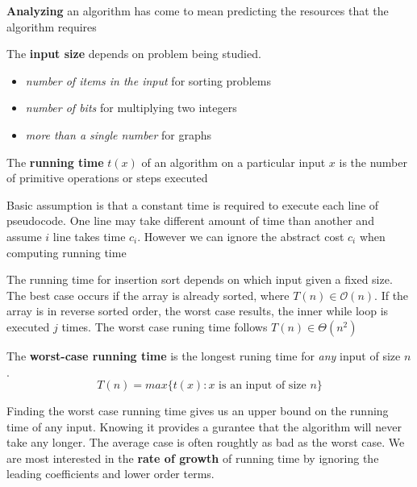 \documentclass[11pt]{article}
\begin{document}
\begin{defn*}
  \textbf{Analyzing} an algorithm has come to mean predicting the resources that the algorithm requires
\end{defn*}

\begin{defn*}
  The \textbf{input size} depends on problem being studied.
  \begin{itemize}
    \item \textit{number of items in the input} for sorting problems
    \item \textit{number of bits} for multiplying two integers
    \item \textit{more than a single number} for graphs
  \end{itemize}
\end{defn*}

\begin{defn*}
  The \textbf{running time} $t(x)$ of an algorithm on a particular input $x$ is the number of primitive operations or steps executed
  \begin{rem}
    Basic assumption is that a constant time is required to execute each line of pseudocode. One line may take different amount of time than another and assume $i$ line takes time $c_i$. However we can ignore the abstract cost $c_i$ when computing running time
  \end{rem}
\end{defn*}

\begin{note}
  The running time for insertion sort depends on which input given a fixed size. The best case occurs if the array is already sorted, where $T(n) \in \mathcal{O}(n)$. If the array is in reverse sorted order, the worst case results, the inner while loop is executed $j$ times. The worst case runing time follows $T(n)\in \Theta(n^2)$
\end{note}

\begin{defn*}
  The \textbf{worst-case running time} is the longest runing time for \textit{any} input of size $n$.
  \[
    T(n) = max \{ t(x): x \text{ is an input of size } n \}
  \]
  \begin{rem}
    Finding the worst case running time gives us an upper bound on the running time of any input. Knowing it provides a gurantee that the algorithm will never take any longer. The average case is often roughtly as bad as the worst case. We are most interested in the \textbf{rate of growth} of running time by ignoring the leading coefficients and lower order terms.
  \end{rem}
\end{defn*}
\end{document}
